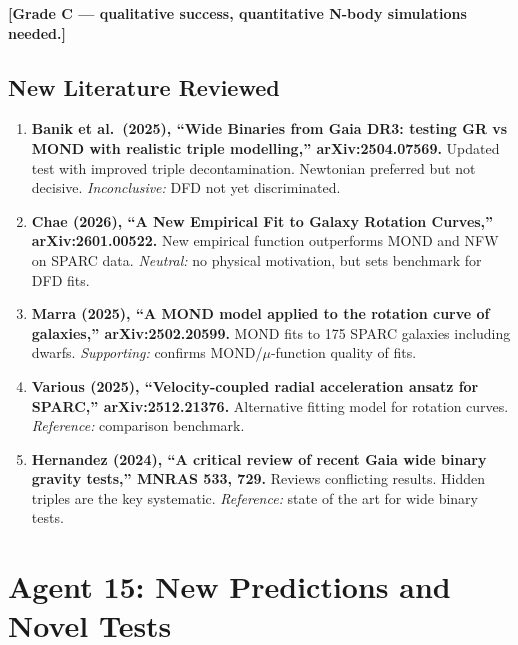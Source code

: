 \documentclass[11pt]{article}
\begin{document}
\textbf{[Grade C --- qualitative success, quantitative N-body
simulations needed.]}

\subsection{New Literature Reviewed}

\begin{tcolorbox}[colback=green!5!white, colframe=green!50!black,
  title=\textbf{Agent 14: NEW LITERATURE REVIEWED}]

\begin{enumerate}

\item \textbf{Banik et al.\ (2025), ``Wide Binaries from Gaia DR3:
  testing GR vs MOND with realistic triple modelling,''
  arXiv:2504.07569.}
  Updated test with improved triple decontamination. Newtonian
  preferred but not decisive. \emph{Inconclusive:} DFD not yet
  discriminated.

\item \textbf{Chae (2026), ``A New Empirical Fit to Galaxy Rotation
  Curves,'' arXiv:2601.00522.}
  New empirical function outperforms MOND and NFW on SPARC data.
  \emph{Neutral:} no physical motivation, but sets benchmark for
  DFD fits.

\item \textbf{Marra (2025), ``A MOND model applied to the rotation
  curve of galaxies,'' arXiv:2502.20599.}
  MOND fits to 175 SPARC galaxies including dwarfs. \emph{Supporting:}
  confirms MOND/$\mu$-function quality of fits.

\item \textbf{Various (2025), ``Velocity-coupled radial acceleration
  ansatz for SPARC,'' arXiv:2512.21376.}
  Alternative fitting model for rotation curves. \emph{Reference:}
  comparison benchmark.

\item \textbf{Hernandez (2024), ``A critical review of recent Gaia
  wide binary gravity tests,'' MNRAS 533, 729.}
  Reviews conflicting results. Hidden triples are the key systematic.
  \emph{Reference:} state of the art for wide binary tests.

\end{enumerate}
\end{tcolorbox}

\section{Agent 15: New Predictions and Novel Tests}
\end{document}
